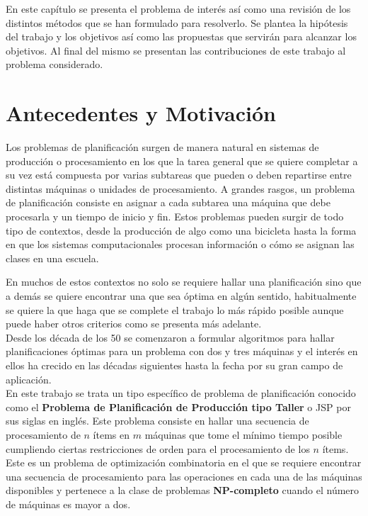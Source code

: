 En este capítulo se presenta el problema de interés así como una revisión de los distintos métodos que se han formulado para resolverlo. Se plantea la hipótesis del trabajo y los objetivos así como las propuestas que servirán para alcanzar los objetivos. Al final del mismo se presentan las contribuciones de este trabajo al problema considerado.
\section{Antecedentes y Motivación}
Los problemas de planificación surgen de manera natural en sistemas de producción o procesamiento en los que la tarea general que se quiere completar a su vez está compuesta por varias subtareas que pueden o deben repartirse entre distintas máquinas o unidades de procesamiento. A grandes rasgos, un problema de planificación consiste en asignar a cada subtarea una máquina que debe procesarla y un tiempo de inicio y fin.  Estos problemas pueden surgir de todo tipo de contextos, desde la producción de algo como una bicicleta hasta la forma en que los sistemas computacionales procesan información o cómo se asignan las clases en una escuela. 

En muchos de estos contextos no solo se requiere hallar una planificación sino que a demás se quiere encontrar una que sea óptima en algún sentido, habitualmente se quiere la que haga que se complete el trabajo lo más rápido posible aunque puede haber otros criterios como se presenta más adelante.\\
Desde los década de los 50 se comenzaron a formular algoritmos para hallar planificaciones óptimas para un problema con dos y tres máquinas\cite{johnson1954optimal} y el interés en ellos ha crecido en las décadas siguientes hasta la fecha por su gran campo de aplicación.\\ 
 
En este trabajo se trata un tipo específico de problema de planificación conocido como el \textbf{Problema de Planificación de Producción tipo Taller} o JSP por sus siglas en inglés. Este problema consiste en hallar una secuencia de procesamiento de $n$ ítems en $m$ máquinas que tome el mínimo tiempo posible cumpliendo ciertas restricciones de orden para el procesamiento de los $n$ ítems. Este es un problema de optimización combinatoria en el que se requiere encontrar una secuencia de procesamiento para las operaciones en cada una de las máquinas disponibles y pertenece a la clase de problemas \textbf{NP-completo} cuando el número de máquinas es mayor a dos\cite{garey1976complexity}.\\

